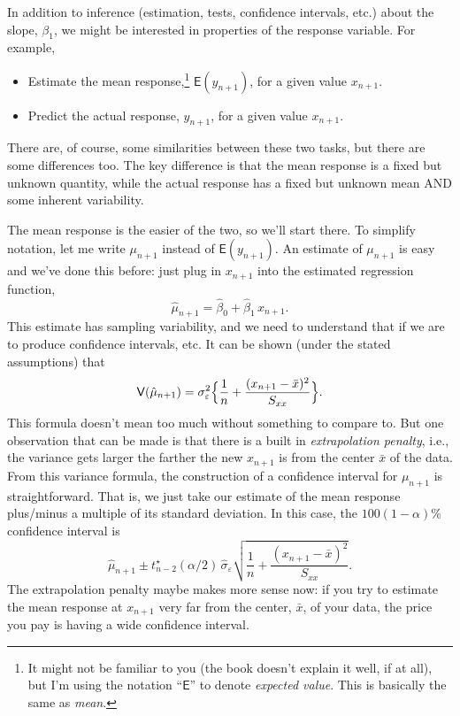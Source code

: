 \documentclass[a4paper, 12pt]{article}
\theoremstyle{plain}
\theoremstyle{definition}
\theoremstyle{remark}
\newcommand{\E}{\mathsf{E}}
\newcommand{\var}{\mathsf{V}}
\newcommand{\eps}{\varepsilon}
\begin{document}
In addition to inference (estimation, tests, confidence intervals, etc.) about the slope, $\beta_1$, we might be interested in properties of the response variable.  For example, 
\begin{itemize}
\item Estimate the mean response,\footnote{It might not be familiar to you (the book doesn't explain it well, if at all), but I'm using the notation ``$\E$'' to denote {\em expected value}.  This is basically the same as {\em mean}.} $\E(y_{n+1})$, for a given value $x_{n+1}$.
\vspace{-2mm}
\item Predict the actual response, $y_{n+1}$, for a given value $x_{n+1}$. 
\end{itemize}
There are, of course, some similarities between these two tasks, but there are some differences too.  The key difference is that the mean response is a fixed but unknown quantity, while the actual response has a fixed but unknown mean AND some inherent variability.  

The mean response is the easier of the two, so we'll start there.  To simplify notation, let me write $\mu_{n+1}$ instead of $\E(y_{n+1})$.  An estimate of $\mu_{n+1}$ is easy and we've done this before: just plug in $x_{n+1}$ into the estimated regression function, 
\[ \hat\mu_{n+1} = \hat\beta_0 + \hat\beta_1 \, x_{n+1}. \]
This estimate has sampling variability, and we need to understand that if we are to produce confidence intervals, etc.  It can be shown (under the stated assumptions) that 
\[ \var(\hat\mu_{n+1}) = \sigma_\eps^2 \Bigl\{ \frac1n + \frac{(x_{n+1} - \bar x)^2}{S_{xx}} \Bigr\}. \]
This formula doesn't mean too much without something to compare to.  But one observation that can be made is that there is a built in {\em extrapolation penalty}, i.e., the variance gets larger the farther the new $x_{n+1}$ is from the center $\bar x$ of the data.  From this variance formula, the construction of a confidence interval for $\mu_{n+1}$ is straightforward.  That is, we just take our estimate of the mean response plus/minus a multiple of its standard deviation.  In this case, the $100(1-\alpha)$\% confidence interval is 
\[ \hat\mu_{n+1} \pm t_{n-2}^\star(\alpha/2) \, \hat\sigma_\eps \sqrt{\frac1n + \frac{(x_{n+1} - \bar x)^2}{S_{xx}}}. \]
The extrapolation penalty maybe makes more sense now: if you try to estimate the mean response at $x_{n+1}$ very far from the center, $\bar x$, of your data, the price you pay is having a wide confidence interval.  
\end{document}
